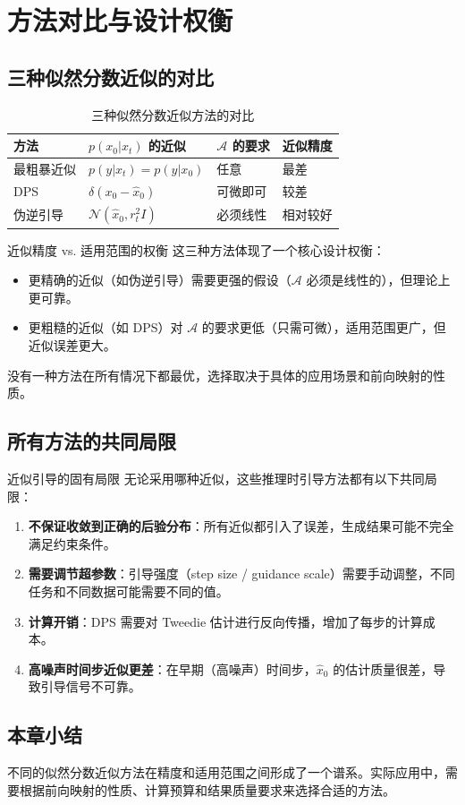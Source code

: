 \section{方法对比与设计权衡}

\subsection{三种似然分数近似的对比}

\begin{table}[H]
\centering
\begin{tabular}{p{}p{}p{}p{}}
\toprule
\textbf{方法} & \textbf{$p(x_0|x_t)$ 的近似} & \textbf{$\mathcal{A}$ 的要求} & \textbf{近似精度} \\
\midrule
最粗暴近似 & $p(y|x_t) = p(y|x_0)$ & 任意 & 最差 \\
DPS & $\delta(x_0 - \hat{x}_0)$ & 可微即可 & 较差 \\
伪逆引导 & $\mathcal{N}(\hat{x}_0, r_t^2 I)$ & 必须线性 & 相对较好 \\
\bottomrule
\end{tabular}
\caption{三种似然分数近似方法的对比}
\end{table}

\begin{importantbox}{近似精度 vs. 适用范围的权衡}
这三种方法体现了一个核心设计权衡：
\begin{itemize}
    \item 更精确的近似（如伪逆引导）需要更强的假设（$\mathcal{A}$ 必须是线性的），但理论上更可靠。
    \item 更粗糙的近似（如 DPS）对 $\mathcal{A}$ 的要求更低（只需可微），适用范围更广，但近似误差更大。
\end{itemize}
没有一种方法在所有情况下都最优，选择取决于具体的应用场景和前向映射的性质。
\end{importantbox}

\subsection{所有方法的共同局限}

\begin{warningbox}{近似引导的固有局限}
无论采用哪种近似，这些推理时引导方法都有以下共同局限：
\begin{enumerate}
    \item \textbf{不保证收敛到正确的后验分布}：所有近似都引入了误差，生成结果可能不完全满足约束条件。
    \item \textbf{需要调节超参数}：引导强度（step size / guidance scale）需要手动调整，不同任务和不同数据可能需要不同的值。
    \item \textbf{计算开销}：DPS 需要对 Tweedie 估计进行反向传播，增加了每步的计算成本。
    \item \textbf{高噪声时间步近似更差}：在早期（高噪声）时间步，$\hat{x}_0$ 的估计质量很差，导致引导信号不可靠。
\end{enumerate}
\end{warningbox}

\subsection{本章小结}

不同的似然分数近似方法在精度和适用范围之间形成了一个谱系。实际应用中，需要根据前向映射的性质、计算预算和结果质量要求来选择合适的方法。



